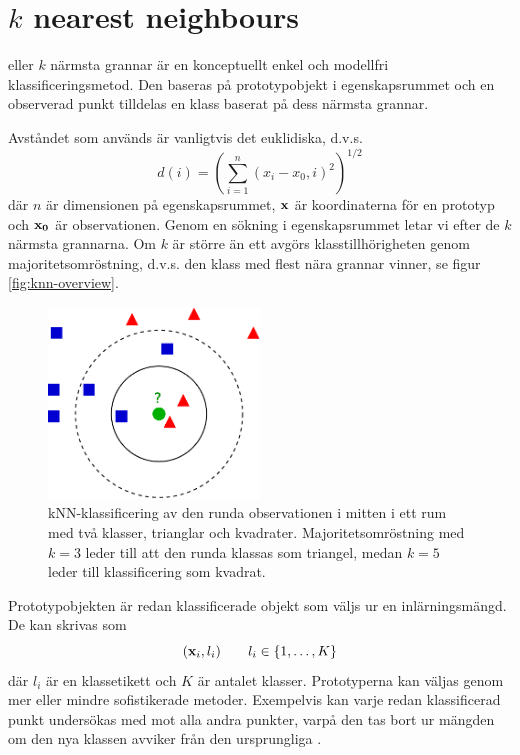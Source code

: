 \documentclass[../rapport_MVEX01-11-05]{subfiles}
\begin{document}
\section{$k$ nearest neighbours}\label{sec:knn}

\knn eller $k$ närmsta grannar är en konceptuellt enkel och modellfri
klassificeringsmetod.
Den baseras på prototypobjekt i egenskapsrummet och en observerad punkt
tilldelas en klass baserat på dess närmsta grannar.

Avståndet som används är vanligtvis det euklidiska, d.v.s.
\begin{equation*}
    d(i) = \left(\sum_{i=1}^n(x_i-x_0,i)^2\right)^{1/2}
\end{equation*}
där $n$ är dimensionen på egenskapsrummet, $\mathbf{x}$ är koordinaterna för en
prototyp och $\mathbf{x_0}$ är observationen. Genom en sökning i
egenskapsrummet letar vi efter de $k$ närmsta grannarna. Om $k$ är större än ett
avgörs klasstillhörigheten genom majoritetsomröstning, d.v.s. den klass med flest
nära grannar vinner, se figur \vref{fig:knn-overview}.

\begin{figure}[!htb]
    \begin{center}
\includegraphics[width=0.5\textwidth]{bilder/KnnClassification}
    \end{center}
    \caption{kNN-klassificering av den runda observationen i mitten i ett rum
    med två klasser, trianglar och kvadrater. Majoritetsomröstning
    med $k=3$ leder till att den runda klassas som triangel, medan $k=5$ leder
    till klassificering som kvadrat.}
    \label{fig:knn-overview}
\end{figure}

Prototypobjekten är redan klassificerade objekt som väljs ur en inlärningsmängd.
De kan skrivas som
\begin{equation*}
    (\mathbf{x}_i, l_i)\qquad l_i \in \{ 1,\dotsc,K \}
\end{equation*}
där $l_i$ är en klassetikett och $K$ är antalet klasser.
Prototyperna kan väljas genom mer eller mindre sofistikerade metoder.
Exempelvis kan varje redan klassificerad punkt undersökas med \knn mot
alla andra punkter, varpå den tas bort ur mängden om den nya klassen avviker
från den ursprungliga \cite{Mazurowski11}.
\end{document}
